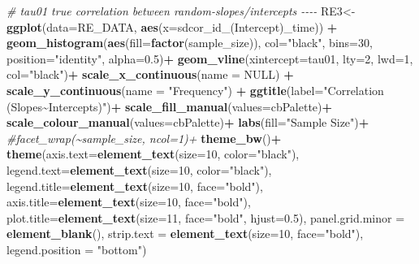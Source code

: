 \documentclass[
]{article}
\newenvironment{Shaded}{\begin{snugshade}}{\end{snugshade}}
\newcommand{\AttributeTok}[1]{\textcolor[rgb]{0.13,0.29,0.53}{#1}}
\newcommand{\CommentTok}[1]{\textcolor[rgb]{0.56,0.35,0.01}{\textit{#1}}}
\newcommand{\ConstantTok}[1]{\textcolor[rgb]{0.56,0.35,0.01}{#1}}
\newcommand{\DecValTok}[1]{\textcolor[rgb]{0.00,0.00,0.81}{#1}}
\newcommand{\FloatTok}[1]{\textcolor[rgb]{0.00,0.00,0.81}{#1}}
\newcommand{\FunctionTok}[1]{\textcolor[rgb]{0.13,0.29,0.53}{\textbf{#1}}}
\newcommand{\NormalTok}[1]{#1}
\newcommand{\OtherTok}[1]{\textcolor[rgb]{0.56,0.35,0.01}{#1}}
\newcommand{\SpecialCharTok}[1]{\textcolor[rgb]{0.81,0.36,0.00}{\textbf{#1}}}
\newcommand{\StringTok}[1]{\textcolor[rgb]{0.31,0.60,0.02}{#1}}
\begin{document}
\begin{Shaded}
\begin{Highlighting}[]
\CommentTok{\# tau01 true correlation between random{-}slopes/intercepts {-}{-}{-}{-}}
\NormalTok{RE3}\OtherTok{\textless{}{-}}\FunctionTok{ggplot}\NormalTok{(}\AttributeTok{data=}\NormalTok{RE\_DATA, }\FunctionTok{aes}\NormalTok{(}\AttributeTok{x=}\StringTok{\textasciigrave{}}\AttributeTok{sdcor\_id\_(Intercept)\_time}\StringTok{\textasciigrave{}}\NormalTok{)) }\SpecialCharTok{+}
  \FunctionTok{geom\_histogram}\NormalTok{(}\FunctionTok{aes}\NormalTok{(}\AttributeTok{fill=}\FunctionTok{factor}\NormalTok{(sample\_size)), }\AttributeTok{col=}\StringTok{"black"}\NormalTok{, }\AttributeTok{bins=}\DecValTok{30}\NormalTok{,}
                 \AttributeTok{position=}\StringTok{"identity"}\NormalTok{, }\AttributeTok{alpha=}\FloatTok{0.5}\NormalTok{)}\SpecialCharTok{+}
  \FunctionTok{geom\_vline}\NormalTok{(}\AttributeTok{xintercept=}\NormalTok{tau01, }\AttributeTok{lty=}\DecValTok{2}\NormalTok{, }\AttributeTok{lwd=}\DecValTok{1}\NormalTok{, }\AttributeTok{col=}\StringTok{"black"}\NormalTok{)}\SpecialCharTok{+}
  \FunctionTok{scale\_x\_continuous}\NormalTok{(}\AttributeTok{name =} \ConstantTok{NULL}\NormalTok{) }\SpecialCharTok{+}
  \FunctionTok{scale\_y\_continuous}\NormalTok{(}\AttributeTok{name =} \StringTok{"Frequency"}\NormalTok{) }\SpecialCharTok{+}
  \FunctionTok{ggtitle}\NormalTok{(}\AttributeTok{label=}\StringTok{"Correlation (Slopes\textasciitilde{}Intercepts)"}\NormalTok{)}\SpecialCharTok{+}
  \FunctionTok{scale\_fill\_manual}\NormalTok{(}\AttributeTok{values=}\NormalTok{cbPalette)}\SpecialCharTok{+}
  \FunctionTok{scale\_colour\_manual}\NormalTok{(}\AttributeTok{values=}\NormalTok{cbPalette)}\SpecialCharTok{+}
  \FunctionTok{labs}\NormalTok{(}\AttributeTok{fill=}\StringTok{"Sample Size"}\NormalTok{)}\SpecialCharTok{+}
  \CommentTok{\#facet\_wrap(\textasciitilde{}sample\_size, ncol=1)+}
  \FunctionTok{theme\_bw}\NormalTok{()}\SpecialCharTok{+}
  \FunctionTok{theme}\NormalTok{(}\AttributeTok{axis.text=}\FunctionTok{element\_text}\NormalTok{(}\AttributeTok{size=}\DecValTok{10}\NormalTok{, }\AttributeTok{color=}\StringTok{"black"}\NormalTok{),}
        \AttributeTok{legend.text=}\FunctionTok{element\_text}\NormalTok{(}\AttributeTok{size=}\DecValTok{10}\NormalTok{, }\AttributeTok{color=}\StringTok{"black"}\NormalTok{),}
        \AttributeTok{legend.title=}\FunctionTok{element\_text}\NormalTok{(}\AttributeTok{size=}\DecValTok{10}\NormalTok{, }\AttributeTok{face=}\StringTok{"bold"}\NormalTok{),}
        \AttributeTok{axis.title=}\FunctionTok{element\_text}\NormalTok{(}\AttributeTok{size=}\DecValTok{10}\NormalTok{, }\AttributeTok{face=}\StringTok{"bold"}\NormalTok{),}
        \AttributeTok{plot.title=}\FunctionTok{element\_text}\NormalTok{(}\AttributeTok{size=}\DecValTok{11}\NormalTok{, }\AttributeTok{face=}\StringTok{"bold"}\NormalTok{, }\AttributeTok{hjust=}\FloatTok{0.5}\NormalTok{),}
        \AttributeTok{panel.grid.minor =} \FunctionTok{element\_blank}\NormalTok{(),}
        \AttributeTok{strip.text =} \FunctionTok{element\_text}\NormalTok{(}\AttributeTok{size=}\DecValTok{10}\NormalTok{, }\AttributeTok{face=}\StringTok{"bold"}\NormalTok{),}
        \AttributeTok{legend.position =} \StringTok{"bottom"}\NormalTok{)}



\end{Highlighting}
\end{Shaded}
\end{document}
